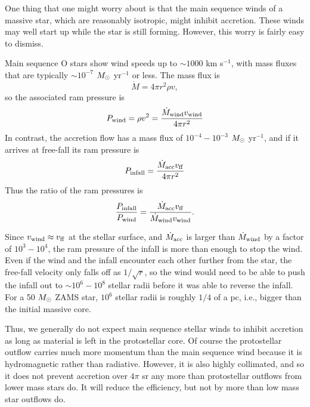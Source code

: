 One thing that one might worry about is that the main sequence winds of a massive star, which are reasonably isotropic, might inhibit accretion. These winds may well start up while the star is still forming. However, this worry is fairly easy to dismiss.

Main sequence O stars show wind speeds up to $\sim 1000$ km s$^{-1}$, with mass fluxes that are typically $\sim 10^{-7}$ $M_{\odot}$ yr$^{-1}$ or less. The mass flux is
\begin{equation}
\dot{M} = 4\pi r^2 \rho v,
\end{equation}
so the associated ram pressure is
\begin{equation}
P_{\rm wind} = \rho v^2 = \frac{\dot{M}_{\rm wind} v_{\rm wind}}{4\pi r^2}
\end{equation}
In contrast, the accretion flow has a mass flux of $10^{-4}-10^{-3}$ $M_{\odot}$ yr$^{-1}$, and if it arrives at free-fall its ram pressure is
\begin{equation}
P_{\rm infall} = \frac{\dot{M}_{\rm acc} v_{\rm ff}}{4\pi r^2}
\end{equation}
Thus the ratio of the ram pressures is
\begin{equation}
\frac{P_{\rm infall}}{P_{\rm wind}} = \frac{\dot{M}_{\rm acc} v_{\rm ff}}{\dot{M}_{\rm wind} v_{\rm wind}}.
\end{equation}

Since $v_{\rm wind} \approx v_{\rm ff}$ at the stellar surface, and $\dot{M}_{\rm acc}$ is larger than $\dot{M}_{\rm wind}$ by a factor of $10^3-10^4$, the ram pressure of the infall is more than enough to stop the wind. Even if the wind and the infall encounter each other further from the star, the free-fall velocity only falls off as $1/\sqrt{r}$, so the wind would need to be able to push the infall out to $\sim 10^6-10^8$ stellar radii before it was able to reverse the infall. For a 50 $M_{\odot}$ ZAMS star, $10^6$ stellar radii is roughly $1/4$ of a pc, i.e., bigger than the initial massive core.

Thus, we generally do not expect main sequence stellar winds to inhibit accretion as long as material is left in the protostellar core. Of course the protostellar outflow carries much more momentum than the main sequence wind because it is hydromagnetic rather than radiative. However, it is also highly collimated, and so it does not prevent accretion over $4\pi$ sr any more than protostellar outflows from lower mass stars do. It will reduce the efficiency, but not by more than low mass star outflows do.

